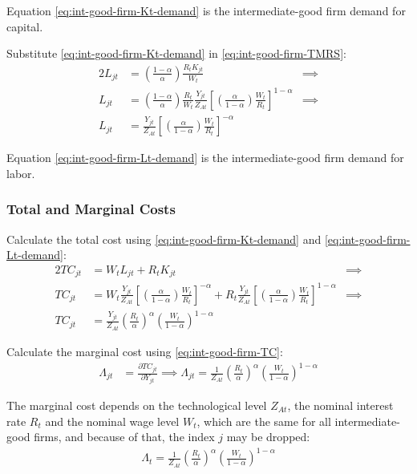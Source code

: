 \documentclass[
thesis.tex
]{subfiles}
\begin{document}
	Equation \ref{eq:int-good-firm-Kt-demand} is the intermediate-good firm demand for capital. 
	
	Substitute \ref{eq:int-good-firm-Kt-demand} in \ref{eq:int-good-firm-TMRS}:
	\begin{alignat}{2}
		L_{jt} & = \left( \frac{1-\alpha}{\alpha} \right) \frac{R_t K_{jt}}{W_t} &\implies \nonumber \\
		L_{jt} & = \left( \frac{1-\alpha}{\alpha} \right) \frac{R_t}{W_t} \frac{Y_{jt}}{Z_{At}} \left[ \left( \frac{\alpha}{1-\alpha} \right) \frac{W_t}{R_t}\right]^{1-\alpha} &\implies \nonumber \\
		L_{jt} & = \frac{Y_{jt}}{Z_{At}} \left[ \left( \frac{\alpha}{1-\alpha} \right) \frac{W_t}{R_t}\right]^{-\alpha} \label{eq:int-good-firm-Lt-demand}
	\end{alignat}
	
	Equation \ref{eq:int-good-firm-Lt-demand} is the intermediate-good firm demand for labor.
	
	\subsubsection*{Total and Marginal Costs}
	
	Calculate the total cost using \ref{eq:int-good-firm-Kt-demand} and \ref{eq:int-good-firm-Lt-demand}:
	\begin{alignat}{2}
		TC_{jt} & = W_t L_{jt} + R_t K_{jt} &\implies \nonumber \\
		TC_{jt} & = W_t \frac{Y_{jt}}{Z_{At}} \left[ \left( \frac{\alpha}{1-\alpha} \right) \frac{W_t}{R_t} \right]^{-\alpha} + R_t \frac{Y_{jt}}{Z_{At}} \left[ \left( \frac{\alpha}{1-\alpha} \right) \frac{W_t}{R_t} \right]^{1-\alpha} &\implies \nonumber \\
		TC_{jt} & = \frac{Y_{jt}}{Z_{At}} \left( \frac{R_t}{\alpha} \right)^{\alpha} \left( \frac{W_t}{1-\alpha} \right)^{1-\alpha} \label{eq:int-good-firm-TC}
	\end{alignat}
	
	
	Calculate the marginal cost using \ref{eq:int-good-firm-TC}: 
	\begin{align}
		\label{eq:int-good-firm-MC}
		\Lambda_{jt} & = \frac{\partial TC_{jt}}{\partial Y_{jt}}
		\implies 
		\Lambda_{jt} = \frac{1}{Z_{At}} \left( \frac{R_t}{\alpha} \right)^{\alpha} \left( \frac{W_t}{1-\alpha} \right)^{1-\alpha}
	\end{align}
	
	The marginal cost depends on the technological level $Z_{At}$, the nominal interest rate $R_t$ and the nominal wage level $W_t$, which are the same for all intermediate-good firms, and because of that, the index $j$ may be dropped:
	\begin{align}
		\label{eq:int-good-firm-MC-2}
		\Lambda_t = \frac{1}{Z_{At}} \left( \frac{R_t}{\alpha} \right)^{\alpha} \left( \frac{W_t}{1-\alpha} \right)^{1-\alpha}
	\end{align}
	
\end{document}
